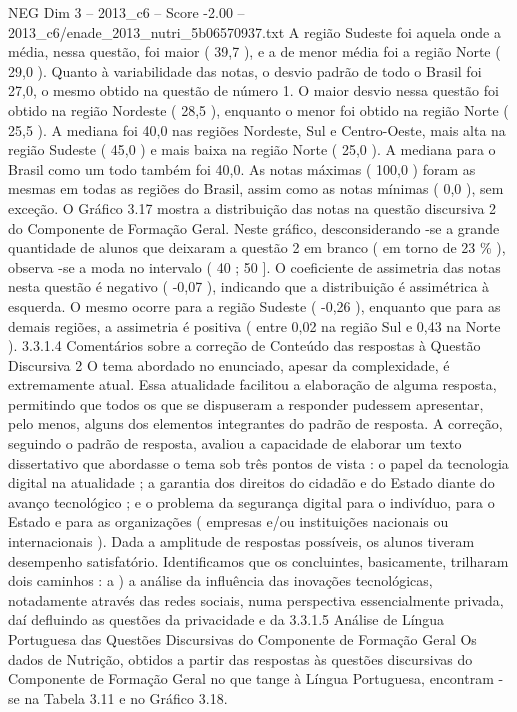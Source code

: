 \begin{textsample}{NEG Dim 3 – 2013\_c6 – Score -2.00 – 2013\_c6/enade\_2013\_nutri\_5b06570937.txt}
A região Sudeste foi aquela onde a média, nessa questão, foi maior ( 39,7 ), e a de menor média foi a região Norte ( 29,0 ).
Quanto à variabilidade das notas, o desvio padrão de todo o Brasil foi 27,0, o mesmo obtido na questão de número 1.
O maior desvio nessa questão foi obtido na região Nordeste ( 28,5 ), enquanto o menor foi obtido na região Norte ( 25,5 ).
A mediana foi 40,0 nas regiões Nordeste, Sul e Centro-Oeste, mais alta na região Sudeste ( 45,0 ) e mais baixa na região Norte ( 25,0 ).
A mediana para o Brasil como um todo também foi 40,0.
As notas máximas ( 100,0 ) foram as mesmas em todas as regiões do Brasil, assim como as notas mínimas ( 0,0 ), sem exceção.
O Gráfico 3.17 mostra a distribuição das notas na questão discursiva 2 do Componente de Formação Geral.
Neste gráfico, desconsiderando -se a grande quantidade de alunos que deixaram a questão 2 em branco ( em torno de 23 \% ), observa -se a moda no intervalo ( 40 ; 50 ].
O coeficiente de assimetria das notas nesta questão é negativo ( -0,07 ), indicando que a distribuição é assimétrica à esquerda.
O mesmo ocorre para a região Sudeste ( -0,26 ), enquanto que para as demais regiões, a assimetria é positiva ( entre 0,02 na região Sul e 0,43 na Norte ). 3.3.1.4 Comentários sobre a correção de Conteúdo das respostas à Questão Discursiva 2 O tema abordado no enunciado, apesar da complexidade, é extremamente atual.
Essa atualidade facilitou a elaboração de alguma resposta, permitindo que todos os que se dispuseram a responder pudessem apresentar, pelo menos, alguns dos elementos integrantes do padrão de resposta.
A correção, seguindo o padrão de resposta, avaliou a capacidade de elaborar um texto dissertativo que abordasse o tema sob três pontos de vista : o papel da tecnologia digital na atualidade ; a garantia dos direitos do cidadão e do Estado diante do avanço tecnológico ; e o problema da segurança digital para o indivíduo, para o Estado e para as organizações ( empresas e/ou instituições nacionais ou internacionais ).
Dada a amplitude de respostas possíveis, os alunos tiveram desempenho satisfatório.
Identificamos que os concluintes, basicamente, trilharam dois caminhos : a ) a análise da influência das inovações tecnológicas, notadamente através das redes sociais, numa perspectiva essencialmente privada, daí defluindo as questões da privacidade e da 3.3.1.5 Análise de Língua Portuguesa das Questões Discursivas do Componente de Formação Geral Os dados de Nutrição, obtidos a partir das respostas às questões discursivas do Componente de Formação Geral no que tange à Língua Portuguesa, encontram -se na Tabela 3.11 e no Gráfico 3.18.

\end{textsample}
